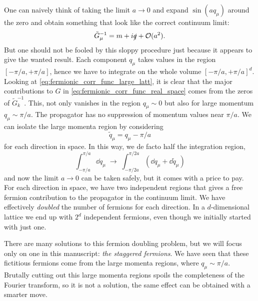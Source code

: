 One can naively think of taking the limit $a \to 0$ and expand $\sin(a q_{\mu})$ around the zero and obtain something that look like the correct continuum limit:
\begin{equation}
    \tilde{G}_{\mu}^{-1} = m + i \slashed{q} + \mathcal{O}(a^2).
\end{equation}
But one should not be fooled by this sloppy procedure just because it appears to give the wanted result.
Each component $q_{\mu}$ takes values in the region $[-\pi/a, +\pi/a]$, hence we have to integrate on the whole volume $[-\pi/a, +\pi/a]^d$.
Looking at \eqref{eq:fermionic_corr_func_large_latt}, it is clear that the major contributions to $G$ in \eqref{eq:fermionic_corr_func_real_space} comes from the zeros of $\tilde{G}_k^{-1}$.
This, not only vanishes in the region $q_{\mu} \sim 0$ but also for large momentum $q_{\mu} \sim \pi/a$.
The propagator has no suppression of momentum values near $\pi/a$.
We can isolate the large momenta region by considering
\begin{equation}
    \tilde{q}_{\mu} = q_{\mu} - \pi/a
\end{equation}
for each direction in space.
In this way, we de facto half the integration region,
\begin{equation}
    \int_{-\pi/a}^{\pi/a} \dd q_{\mu} \;\to\;
    \int_{-\pi/2a}^{\pi/2a} (\dd q_{\mu} + \dd \tilde{q}_{\mu})
\end{equation}
and now the limit $a \to 0$ can be taken safely, but it comes with a price to pay.
For each direction in space, we have two independent regions that gives a free fermion contribution to the propagator in the continuum limit.
We have effectively \emph{doubled} the number of fermions for each direction.
In a $d$-dimensional lattice we end up with $2^d$ independent fermions, even though we initially started with just one.

There are many solutions to this fermion doubling problem\citneeded, but we will focus only on one in this manuscript: \emph{the staggered fermions}\citneeded.
We have seen that these fictitious fermions come from the large momenta regions, where $q_{\mu} \sim \pi/a$.
Brutally cutting out this large momenta regions spoils the completeness of the Fourier transform, so it is not a solution, the same effect can be obtained with a smarter move.

